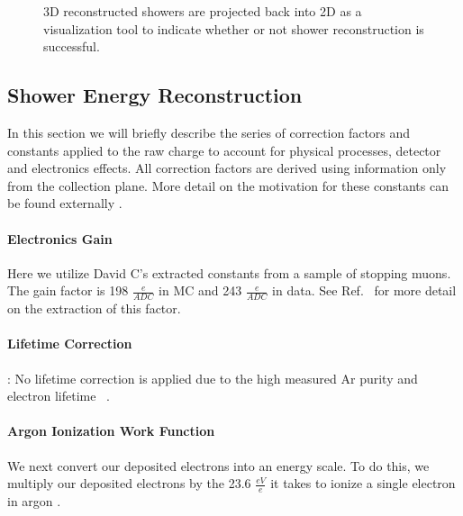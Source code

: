 \documentclass{article}
\begin{document}
\begin{figure}[h!] %
\centering
{}
\caption{3D reconstructed showers are projected back into 2D as a visualization tool to indicate whether or not shower reconstruction is successful. }
\label{fig:showers}
\end{figure}

\subsection{Shower Energy Reconstruction}
\label{sec:ereco}
\par In this section we will briefly describe the series of correction factors and constants applied to the raw charge to account for physical processes, detector and electronics effects. All correction factors are derived using information only from the collection plane.  More detail on the motivation for these constants can be found externally \cite{bib:davidc_energycalibration}\cite{bib:davidc_recomb}.

\paragraph{Electronics Gain} 
Here we utilize David C’s extracted constants from a sample of stopping muons.  The gain factor is 198 $\frac{e}{ADC}$ in MC and 243 $\frac{e}{ADC}$ in data. See Ref.~\cite{bib:davidc_energycalibration_gain} for more detail on the extraction of this factor.
\paragraph{ Lifetime Correction}: No lifetime correction is applied due to the high measured Ar purity and electron lifetime ~\cite{bib:purity}. 
\paragraph{Argon Ionization Work Function} We next convert our deposited electrons into an energy scale. To do this, we multiply our deposited electrons by the 23.6 $\frac{eV}{e}$ it takes to ionize a single electron in argon \cite{bib:ionization_per_electron}. 
\end{document}

